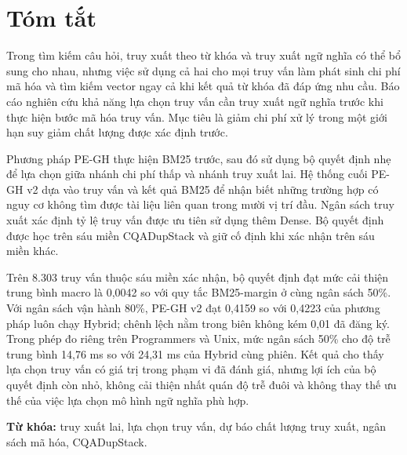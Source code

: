 \chapter*{Tóm tắt}
Trong tìm kiếm câu hỏi, truy xuất theo từ khóa và truy xuất ngữ nghĩa có thể bổ sung cho nhau, nhưng việc sử dụng cả hai cho mọi truy vấn làm phát sinh chi phí mã hóa và tìm kiếm vector ngay cả khi kết quả từ khóa đã đáp ứng nhu cầu. Báo cáo nghiên cứu khả năng lựa chọn truy vấn cần truy xuất ngữ nghĩa trước khi thực hiện bước mã hóa truy vấn. Mục tiêu là giảm chi phí xử lý trong một giới hạn suy giảm chất lượng được xác định trước.

Phương pháp PE-GH thực hiện BM25 trước, sau đó sử dụng bộ quyết định nhẹ để lựa chọn giữa nhánh chi phí thấp và nhánh truy xuất lai. Hệ thống cuối PE-GH v2 dựa vào truy vấn và kết quả BM25 để nhận biết những trường hợp có nguy cơ không tìm được tài liệu liên quan trong mười vị trí đầu. Ngân sách truy xuất xác định tỷ lệ truy vấn được ưu tiên sử dụng thêm Dense. Bộ quyết định được học trên sáu miền CQADupStack và giữ cố định khi xác nhận trên sáu miền khác.

Trên 8.303 truy vấn thuộc sáu miền xác nhận, bộ quyết định đạt mức cải thiện trung bình macro \ndcg{} là 0,0042 so với quy tắc BM25-margin ở cùng ngân sách 50\%. Với ngân sách vận hành 80\%, PE-GH v2 đạt 0,4159 so với 0,4223 của phương pháp luôn chạy Hybrid; chênh lệch nằm trong biên không kém 0,01 đã đăng ký. Trong phép đo riêng trên Programmers và Unix, mức ngân sách 50\% cho độ trễ trung bình 14,76 ms so với 24,31 ms của Hybrid cùng phiên. Kết quả cho thấy lựa chọn truy vấn có giá trị trong phạm vi đã đánh giá, nhưng lợi ích của bộ quyết định còn nhỏ, không cải thiện nhất quán độ trễ đuôi và không thay thế ưu thế của việc lựa chọn mô hình ngữ nghĩa phù hợp.

\noindent\textbf{Từ khóa:} truy xuất lai, lựa chọn truy vấn, dự báo chất lượng truy xuất, ngân sách mã hóa, CQADupStack.
